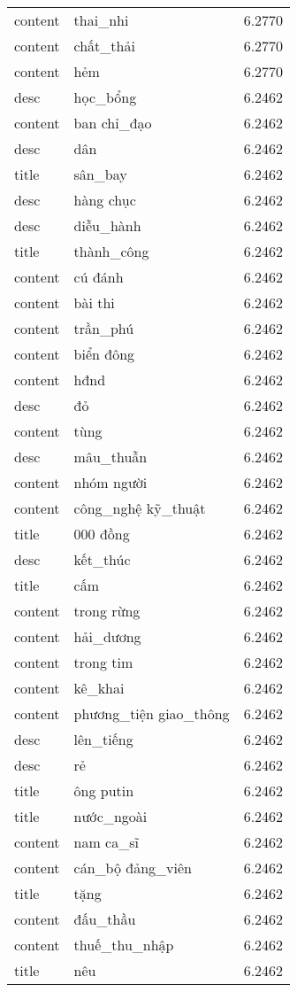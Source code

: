 \documentclass{article}
\begin{document}
\begin{tabular}{lll}
content & thai\_nhi & 6.2770\\
content & chất\_thải & 6.2770\\
content & hẻm & 6.2770\\
desc & học\_bổng & 6.2462\\
content & ban chỉ\_đạo & 6.2462\\
desc & dân & 6.2462\\
title & sân\_bay & 6.2462\\
desc & hàng chục & 6.2462\\
desc & diễu\_hành & 6.2462\\
title & thành\_công & 6.2462\\
content & cú đánh & 6.2462\\
content & bài thi & 6.2462\\
content & trần\_phú & 6.2462\\
content & biển đông & 6.2462\\
content & hđnd & 6.2462\\
desc & đỏ & 6.2462\\
content & tùng & 6.2462\\
desc & mâu\_thuẫn & 6.2462\\
content & nhóm người & 6.2462\\
content & công\_nghệ kỹ\_thuật & 6.2462\\
title & 000 đồng & 6.2462\\
desc & kết\_thúc & 6.2462\\
title & cấm & 6.2462\\
content & trong rừng & 6.2462\\
content & hải\_dương & 6.2462\\
content & trong tim & 6.2462\\
content & kê\_khai & 6.2462\\
content & phương\_tiện giao\_thông & 6.2462\\
desc & lên\_tiếng & 6.2462\\
desc & rẻ & 6.2462\\
title & ông putin & 6.2462\\
title & nước\_ngoài & 6.2462\\
content & nam ca\_sĩ & 6.2462\\
content & cán\_bộ đảng\_viên & 6.2462\\
title & tặng & 6.2462\\
content & đấu\_thầu & 6.2462\\
content & thuế\_thu\_nhập & 6.2462\\
title & nêu & 6.2462\\

\end{tabular}
\end{document}
